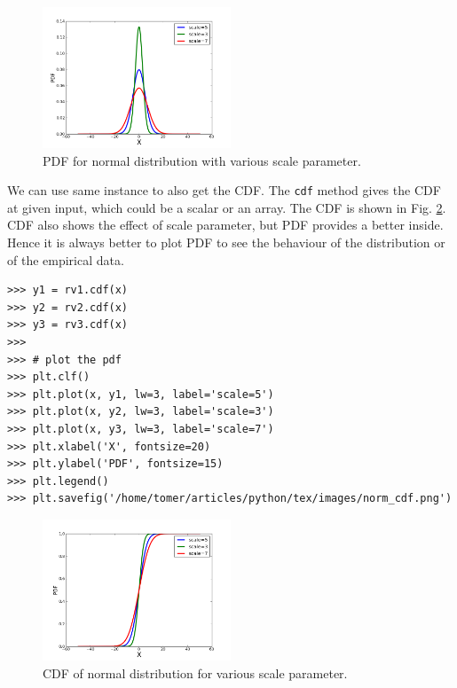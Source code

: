 \documentclass[10pt]{book}
\begin{document}
{\beforefig
\begin{figure}[h!]
  \centering
    \includegraphics[width=0.5\textwidth]{images/norm_pdf.png}
  \caption{PDF for normal distribution with various scale parameter.}
   \label{fig:pdf_norm}
\end{figure}
\afterfig

We can use same instance to also get the CDF. The \verb"cdf" method gives the CDF at given input, which could be a scalar or an array. The CDF is shown in Fig. \ref{fig:cdf_norm}. CDF also shows the effect of scale parameter, but PDF provides a better inside. Hence it is always better to plot PDF to see the behaviour of the distribution or of the empirical data. 

\beforeverb \begin{verbatim}
>>> y1 = rv1.cdf(x)
>>> y2 = rv2.cdf(x)
>>> y3 = rv3.cdf(x)
>>> 
>>> # plot the pdf
>>> plt.clf()
>>> plt.plot(x, y1, lw=3, label='scale=5')
>>> plt.plot(x, y2, lw=3, label='scale=3')
>>> plt.plot(x, y3, lw=3, label='scale=7')
>>> plt.xlabel('X', fontsize=20)
>>> plt.ylabel('PDF', fontsize=15)
>>> plt.legend()
>>> plt.savefig('/home/tomer/articles/python/tex/images/norm_cdf.png')
\end{verbatim} \afterverb

\beforefig
\begin{figure}[!h]
  \centering
    \includegraphics[width=0.5\textwidth]{images/norm_cdf.png}
  \caption{CDF of normal distribution for various scale parameter.}
   \label{fig:cdf_norm}
\end{figure}
\afterfig

}
\end{document}
